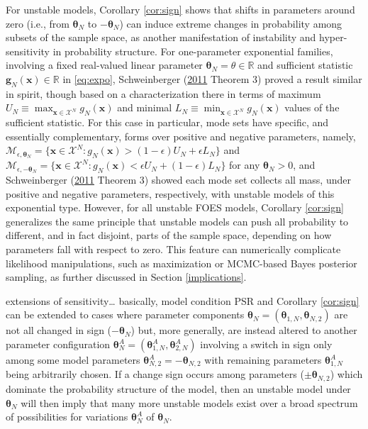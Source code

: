 \documentclass[]{article}
\theoremstyle{definition}
\let\BeginKnitrBlock\begin \let\EndKnitrBlock\end
\begin{document}
For unstable models, Corollary \ref{cor:sign} shows that shifts in
parameters around zero (i.e., from \(\boldsymbol \theta_N\) to
\(-\boldsymbol \theta_N\)) can induce extreme changes in probability
among subsets of the sample space, as another manifestation of
instability and hyper-sensitivity in probability structure. For
one-parameter exponential families, involving a fixed real-valued linear
parameter \(\boldsymbol \theta_N = \theta \in \mathbb{R}\) and
sufficient statistic \(\boldsymbol g_N(\boldsymbol x)\in \mathbb{R}\) in
\eqref{eq:expo}, Schweinberger
(\protect\hyperlink{ref-schweinberger2011instability}{2011} Theorem 3)
proved a result similar in spirit, though based on a characterization
there in terms of maximum
\(U_N \equiv \max_{\boldsymbol x\in\mathcal{X}^N}g_N(\boldsymbol x)\)
and minimal
\(L_N \equiv \min_{\boldsymbol x\in\mathcal{X}^N}g_N(\boldsymbol x)\)
values of the sufficient statistic. For this case in particular, mode
sets have specific, and essentially complementary, forms over positive
and negative parameters, namely,
\(\mathcal{M}_{\epsilon, \boldsymbol \theta_N} = \{\boldsymbol x \in\mathcal{X}^N: g_N(\boldsymbol x) > (1-\epsilon) U_N + \epsilon L_N \}\)
and
\(\mathcal{M}_{\epsilon, -\boldsymbol \theta_N} = \{\boldsymbol x \in\mathcal{X}^N: g_N(\boldsymbol x) < \epsilon U_N + (1-\epsilon) L_N \}\)
for any \(\boldsymbol \theta_N>0\), and Schweinberger
(\protect\hyperlink{ref-schweinberger2011instability}{2011} Theorem 3)
showed each mode set collects all mass, under positive and negative
parameters, respectively, with unstable models of this exponential type.
However, for all unstable FOES models, Corollary \ref{cor:sign}
generalizes the same principle that unstable models can push all
probability to different, and in fact disjoint, parts of the sample
space, depending on how parameters fall with respect to zero. This
feature can numerically complicate likelihood manipulations, such as
maximization or MCMC-based Bayes posterior sampling, as further
discussed in Section \ref{implications}.

\BeginKnitrBlock{remark}[need to briefly finish]
\iffalse <span class="remark"><em>Remark (need to briefly finish). \fi{}
extensions of sensitivity\ldots{} basically, model condition PSR and
Corollary \ref{cor:sign} can be extended to cases where parameter
components
\(\boldsymbol \theta_N =(\boldsymbol \theta_{1,N}, \boldsymbol \theta_{N,2})\)
are not all changed in sign (\(-\boldsymbol \theta_N\)) but, more
generally, are instead altered to another parameter configuration
\(\boldsymbol \theta_{N}^A = ( \boldsymbol \theta_{1,N}^A, \boldsymbol \theta_{2,N}^A )\)
involving a switch in sign only among some model parameters
\(\boldsymbol \theta_{N,2}^A=- \boldsymbol \theta_{N,2}\) with remaining
parameters \(\boldsymbol \theta_{1,N}^A\) being arbitrarily chosen. If a
change sign occurs among parameters (\(\pm \boldsymbol \theta_{N,2}\))
which dominate the probability structure of the model, then an unstable
model under \(\boldsymbol \theta_N\) will then imply that many more
unstable models exist over a broad spectrum of possibilities for
variations \(\boldsymbol \theta_{N}^A\) of \(\boldsymbol \theta_N\).
\EndKnitrBlock{remark}
\end{document}
